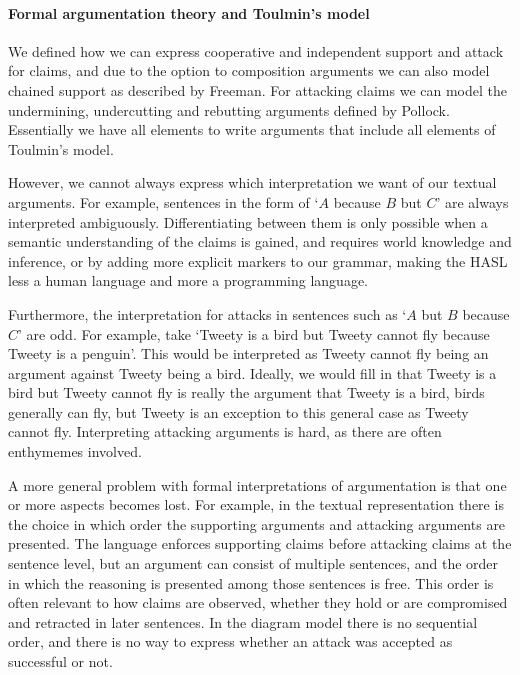 
\paragraph{Formal argumentation theory and Toulmin's model}
We defined how we can express cooperative and independent support and attack for claims, and due to the option to composition arguments we can also model chained support as described by Freeman\cite{Freeman:1991ef}. For attacking claims we can model the undermining, undercutting and rebutting arguments defined by Pollock\cite{pollock1987}. Essentially we have all elements to write arguments that include all elements of Toulmin's model.

However, we cannot always express which interpretation we want of our textual arguments. For example, sentences in the form of `$A$ because $B$ but $C$' are always interpreted ambiguously. Differentiating between them is only possible when a semantic understanding of the claims is gained, and requires world knowledge and inference, or by adding more explicit markers to our grammar, making the HASL less a human language and more a programming language. 

Furthermore, the interpretation for attacks in sentences such as `$A$ but $B$ because $C$' are odd. For example, take `Tweety is a bird but Tweety cannot fly because Tweety is a penguin'. This would be interpreted as Tweety cannot fly being an argument against Tweety being a bird. Ideally, we would fill in that Tweety is a bird but Tweety cannot fly is really the argument that Tweety is a bird, birds generally can fly, but Tweety is an exception to this general case as Tweety cannot fly. Interpreting attacking arguments is hard, as there are often enthymemes involved.

A more general problem with formal interpretations of argumentation is that one or more aspects becomes lost. For example, in the textual representation there is the choice in which order the supporting arguments and attacking arguments are presented. The language enforces supporting claims before attacking claims at the sentence level, but an argument can consist of multiple sentences, and the order in which the reasoning is presented among those sentences is free. This order is often relevant to how claims are observed, whether they hold or are compromised and retracted in later sentences. In the diagram model there is no sequential order, and there is no way to express whether an attack was accepted as successful or not.

